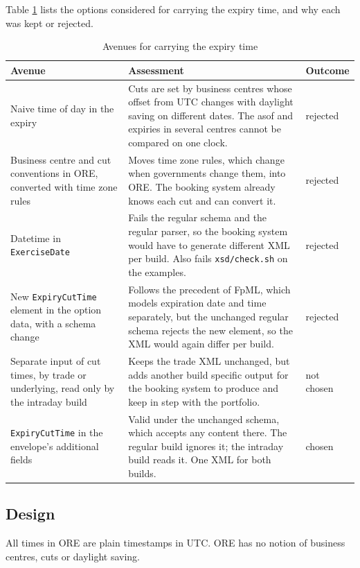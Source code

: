 \documentclass[12pt, a4paper]{article}
\begin{document}
Table \ref{tab:cutavenues} lists the options considered for carrying the expiry time, and why each was kept or
rejected.

\begin{table}[H]
\centering
\small
\begin{tabular}{|>{\raggedright\arraybackslash}p{4.0cm}|>{\raggedright\arraybackslash}p{8.3cm}|l|}
\hline
Avenue & Assessment & Outcome \\
\hline
Naive time of day in the expiry & Cuts are set by business centres whose offset from UTC changes with daylight saving on
different dates. The asof and expiries in several centres cannot be compared on one clock. & rejected \\
\hline
Business centre and cut conventions in ORE, converted with time zone rules & Moves time zone rules, which change when
governments change them, into ORE. The booking system already knows each cut and can convert it. & rejected \\
\hline
Datetime in \texttt{ExerciseDate} & Fails the regular schema and the regular parser, so the booking system would have to
generate different XML per build. Also fails \texttt{xsd/check.sh} on the examples. & rejected \\
\hline
New \texttt{ExpiryCutTime} element in the option data, with a schema change & Follows the precedent of FpML, which
models expiration date and time separately, but the unchanged regular schema rejects the new element, so the XML would
again differ per build. & rejected \\
\hline
Separate input of cut times, by trade or underlying, read only by the intraday build & Keeps the trade XML unchanged,
but adds another build specific output for the booking system to produce and keep in step with the portfolio. & not
chosen \\
\hline
\texttt{ExpiryCutTime} in the envelope's additional fields & Valid under the unchanged schema, which accepts any content
there. The regular build ignores it; the intraday build reads it. One XML for both builds. & chosen \\
\hline
\end{tabular}
\caption{Avenues for carrying the expiry time}
\label{tab:cutavenues}
\end{table}

\subsection{Design}

All times in ORE are plain timestamps in UTC. ORE has no notion of business centres, cuts or daylight saving.
\end{document}
